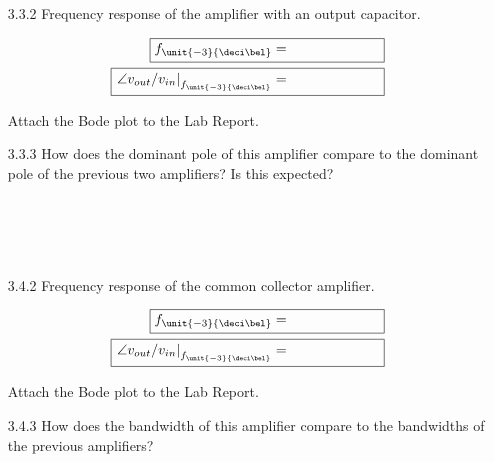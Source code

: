 \documentclass{article}
\begin{document}
\begin{enumerate}
	\item[3.3.2] Frequency response of the amplifier with an output capacitor.

	\begin{align*}
    		\boxed{f_{\unit{-3}{\deci\bel}} = ~~~~~~~~~~~~~~~~~~~~ } \\
    		\boxed{\left.\angle v_{out}/v_{in}\right|_{f_{\unit{-3}{\deci\bel}}} = ~~~~~~~~~~~~~~~~~~~~ }
  	\end{align*}

	Attach the Bode plot to the Lab Report.

	\item[3.3.3] How does the dominant pole of this amplifier compare to the dominant pole of the previous two amplifiers? Is this expected? \\~\\~\\~\\~\\

	\item[3.4.2] Frequency response of the common collector amplifier.

	\begin{align*}
    		\boxed{f_{\unit{-3}{\deci\bel}} = ~~~~~~~~~~~~~~~~~~~~ } \\
    		\boxed{\left.\angle v_{out}/v_{in}\right|_{f_{\unit{-3}{\deci\bel}}} = ~~~~~~~~~~~~~~~~~~~~ }
  	\end{align*}

	Attach the Bode plot to the Lab Report.

	\item[3.4.3] How does the bandwidth of this amplifier compare to the bandwidths of the previous amplifiers? \\~\\~\\~\\~\\
	

\end{enumerate}
\end{document}
